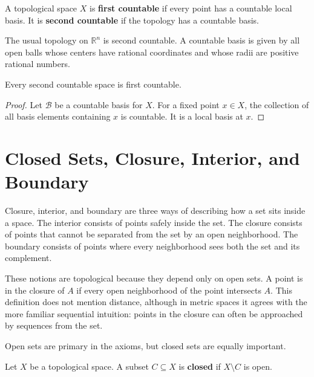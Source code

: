 \begin{definition}
A topological space $X$ is \textbf{first countable} if every point has a countable local basis. It is \textbf{second countable} if the topology has a countable basis.
\end{definition}

\begin{example}
The usual topology on $\mathbb{R}^n$ is second countable. A countable basis is given by all open balls whose centers have rational coordinates and whose radii are positive rational numbers.
\end{example}

\begin{proposition}
Every second countable space is first countable.
\end{proposition}

\begin{proof}
Let $\mathcal{B}$ be a countable basis for $X$. For a fixed point $x\in X$, the collection of all basis elements containing $x$ is countable. It is a local basis at $x$.
\end{proof}

\section{Closed Sets, Closure, Interior, and Boundary}


Closure, interior, and boundary are three ways of describing how a set sits inside a space. The interior consists of points safely inside the set. The closure consists of points that cannot be separated from the set by an open neighborhood. The boundary consists of points where every neighborhood sees both the set and its complement.

These notions are topological because they depend only on open sets. A point is in the closure of $A$ if every open neighborhood of the point intersects $A$. This definition does not mention distance, although in metric spaces it agrees with the more familiar sequential intuition: points in the closure can often be approached by sequences from the set.

Open sets are primary in the axioms, but closed sets are equally important.

\begin{definition}
Let $X$ be a topological space. A subset $C\subseteq X$ is \textbf{closed} if $X\setminus C$ is open.
\end{definition}

